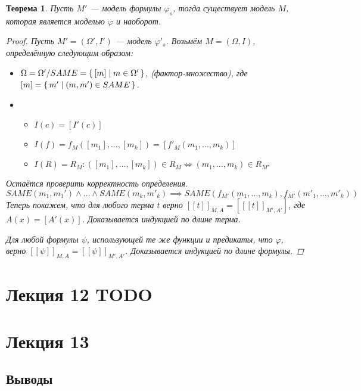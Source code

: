 \documentclass[12pt]{article}
\theoremstyle{definition}
\theoremstyle{plain}
\newtheorem{theorem}{Теорема}[section]
\theoremstyle{remark}
\begin{document}
\begin{theorem}
  Пусть $M'$ --- модель формулы $\varphi_s$, тогда существует модель
  $M$, которая является моделью $\varphi$ и наоборот.
  \begin{proof}
    Пусть $M' = (\Omega', I')$ --- модель $\varphi'_s$. Возьмём $M =
    (\Omega, I)$, определённую следующим образом:
    \begin{itemize}
      \item  $\Omega = \Omega' / SAME = \set{[m] \mid m \in
        \Omega'}$, (фактор-множество), где $[m] = \set{m' \mid (m,
        m') \in SAME}$.

      \item
        \begin{itemize}
          \item $I(c) = [I'(c)]$

          \item $I(f) = f_M([m_1], \dots, [m_k]) = [f'_M(m_1, \dots, m_k)]$

          \item $I(R) = R_M \colon ([m_1], \dots, [m_k]) \in R_M \iff
            (m_1, \dots, m_k) \in R_{M'}$
        \end{itemize}
    \end{itemize}
    Остаётся проверить корректность определения.
    \[
      SAME(m_1, m_1') \land \dots \land SAME(m_k, m'_k) \implies
      SAME(f_{M'}(m_1, \dots, m_k), f_{M'}(m'_1, \dots, m'_k))
    \]
    Теперь покажем, что для любого терма $t$ верно $[[t]]_{M,A} =
    [[[t]]_{M',A'}]$, где $A(x) = [A'(x)]$. Доказывается индукцией по
    длине терма.

    Для любой формулы $\psi$, использующей те же функции и предикаты,
    что $\varphi$, верно $[[\psi]]_{M,A} = [[\psi]]_{M',A'}$.
    Доказывается индукцией по длине формулы.
  \end{proof}
\end{theorem}

\pagebreak

\section{Лекция 12 TODO}

\pagebreak

\section{Лекция 13}

\subsection{Выводы}
\end{document}
